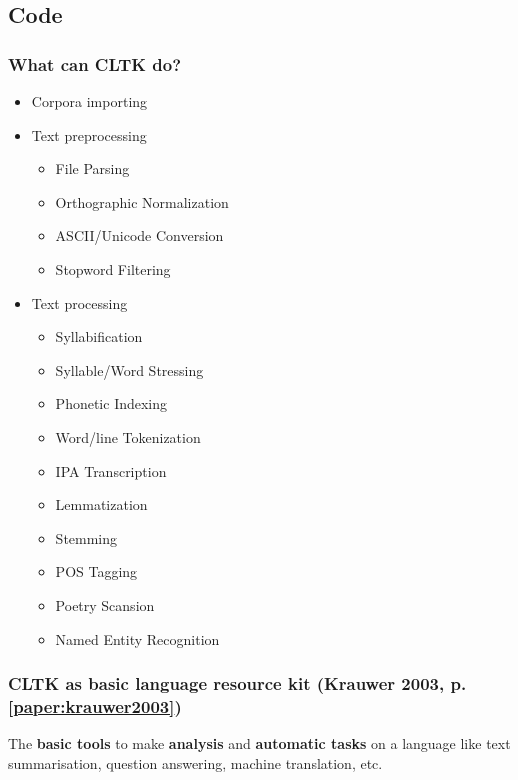 \documentclass{beamer}
\begin{document}
\subsection{Code}

\begin{frame}
\frametitle{What can CLTK do?}
\begin{itemize}
    \item Corpora importing
    \item Text preprocessing
    \begin{itemize}
        \item File Parsing
        \item Orthographic Normalization
        \item ASCII/Unicode Conversion
        \item Stopword Filtering
    \end{itemize}
    \item Text processing
    \begin{itemize}
    \item Syllabification
    \item Syllable/Word Stressing
    \item Phonetic Indexing
    \item Word/line Tokenization
    \item IPA Transcription
    \item Lemmatization
    \item Stemming
    \item POS Tagging
    \item Poetry Scansion
    \item Named Entity Recognition
    \end{itemize}
\end{itemize}
\end{frame}

\begin{frame}
\frametitle{CLTK as \textbf{b}asic \textbf{la}nguage \textbf{r}esource \textbf{k}it (Krauwer 2003, p. \ref{paper:krauwer2003})}
The \textbf{basic tools} to make \textbf{analysis} and \textbf{automatic tasks} on a language like text summarisation, question answering, machine translation, etc.

\end{frame}



\end{document}
